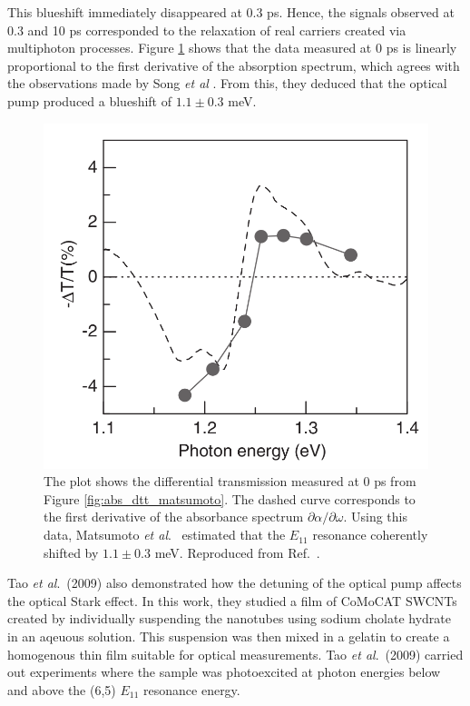 This blueshift immediately disappeared at 0.3 ps. Hence, the signals observed at 0.3 and 10 ps corresponded to the relaxation of real carriers created via multiphoton processes. Figure \ref{fig:dtt_matsumoto} shows that the data measured at 0 ps is linearly proportional to the first derivative of the absorption spectrum, which agrees with the observations made by Song \textit{et al} \cite{song2006optical}. From this, they deduced that the optical pump produced a blueshift of $1.1 \pm 0.3$ meV.

\begin{figure}[ht]
	\centering
	\includegraphics[scale=0.3]{images/chapter_prior_works/dtt_matsumoto}
	\caption{The plot shows the differential transmission measured at 0 ps from Figure \ref{fig:abs_dtt_matsumoto}. The dashed curve corresponds to the first derivative of the absorbance spectrum $\partial \alpha / \partial \omega$. Using this data, Matsumoto \textit{et al}.\ \cite{matsumoto2006optical} estimated that the $E_{11}$ resonance coherently shifted by $1.1 \pm 0.3$ meV. Reproduced from Ref.\ \cite{matsumoto2006optical}.}
	\label{fig:dtt_matsumoto}
\end{figure}

Tao \textit{et al}.\ (2009) \cite{tao2009subpicosecond} also demonstrated how the detuning of the optical pump affects the optical Stark effect. In this work, they studied a film of CoMoCAT SWCNTs created by individually suspending the nanotubes using sodium cholate hydrate in an aqeuous solution. This suspension was then mixed in a gelatin to create a homogenous thin film suitable for optical measurements. Tao \textit{et al}.\ (2009) \cite{tao2009subpicosecond} carried out experiments where the sample was photoexcited at photon energies below and above the (6,5) $E_{11}$ resonance energy.

